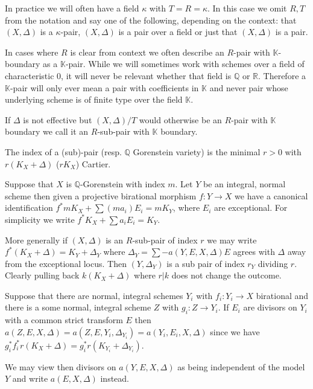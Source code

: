 \documentclass[a4paper,12pt]{book}
\begin{document}
In practice we will often have a field $\kappa$ with $T=R=\kappa$. In this case we omit $R,T$ from the notation and say one of the following, depending on the context: that $(X,\Delta)$ is a $\kappa$-pair, $(X,\Delta)$ is a pair over a field or just that $(X,\Delta)$ is a pair.

In cases where $R$ is clear from context we often describe an $R$-pair with $\mathbb{K}$-boundary as a $\mathbb{K}$-pair. While we will sometimes work with schemes over a field of characteristic $0$, it will never be relevant whether that field is $\mathbb{Q}$ or $\mathbb{R}$. Therefore a $\mathbb{K}$-pair will only ever mean a pair with coefficients in $\mathbb{K}$ and never pair whose underlying scheme is of finite type over the field $\mathbb{K}$. 

\begin{definition}
	If $\Delta$ is not effective but $(X,\Delta)/T$ would otherwise be an $R$-pair with $\mathbb{K}$ boundary we call it an $R$-sub-pair with $\mathbb{K}$ boundary.
	
	The index of a (sub)-pair (resp. $\mathbb{Q}$ Gorenstein variety) is the minimal $r>0$ with $r(K_{X}+\Delta)$ ($rK_{X}$) Cartier.
\end{definition}

Suppose that $X$ is $\mathbb{Q}$-Gorenstein with index $m$. Let $Y$ be an integral, normal scheme then given a projective birational morphism $f:Y \to X$ we have a canonical identification $f^{*}mK_{X}+\sum(ma_{i})E_{i}=mK_{Y}$, where $E_{i}$ are exceptional. For simplicity we write $f^{*}K_{X}+\sum a_{i}E_{i} =K_{Y}$.

More generally if $(X,\Delta)$ is an $R$-sub-pair of index $r$ we may write $f^{*}(K_{X}+\Delta)=K_{Y}+ \Delta_{Y}$ where $\Delta_{Y}=\sum -a(Y,E,X,\Delta)E$ agrees with $\Delta$ away from the exceptional locus. Then $(Y,\Delta_{Y})$ is a sub pair of index $r_{Y}$ dividing $r$. Clearly pulling back $k(K_{X}+\Delta)$ where $r|k$ does not change the outcome.

Suppose that there are normal, integral schemes $Y_{i}$ with $f_{i}:Y_{i} \to X$ birational and there is a some normal, integral scheme $Z$ with $g_{i}:Z\to Y_{i}$. If $E_{i}$ are divisors on $Y_{i}$ with a common strict transform $E$ then $a(Z,E,X,\Delta)=a(Z,E,Y_{i},\Delta_{Y_{i}})=a(Y_{i},E_{i},X,\Delta)$ since we have $g_{i}^{*}f_{i}^{*}r(K_{X}+\Delta)=g_{i}^{*}r(K_{Y_{i}}+\Delta_{Y_{i}})$.

We may view then divisors on $a(Y,E,X,\Delta)$ as being independent of the model $Y$ and write $a(E,X,\Delta)$ instead. 
\end{document}
